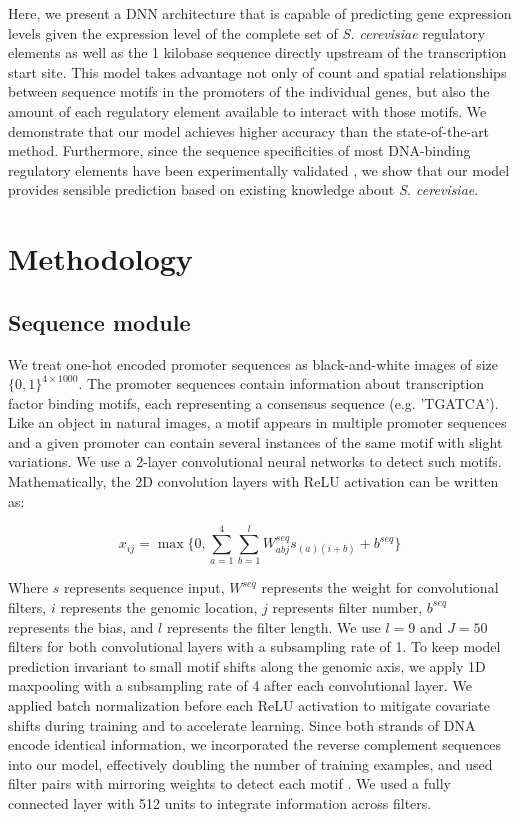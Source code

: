 \documentclass{article}
\begin{document}
Here, we present a DNN architecture that is capable of predicting gene expression levels given the expression level of the complete set of \textit{S. cerevisiae} regulatory elements as well as the 1 kilobase sequence directly upstream of the transcription start site. This model takes advantage not only of count and spatial relationships between sequence motifs in the promoters of the individual genes, but also the amount of each regulatory element available to interact with those motifs. We demonstrate that our model achieves higher accuracy than the state-of-the-art method. Furthermore, since the sequence specificities of most DNA-binding regulatory elements have been experimentally validated \cite{deBoer:2011ic}, we show that our model provides sensible prediction based on existing knowledge about \textit{S. cerevisiae}.


\section{Methodology}

\subsection{Sequence module}
We treat one-hot encoded promoter sequences as black-and-white images of size $\{0,1\}^{4 \times 1000}$. The promoter sequences contain information about transcription factor binding motifs, each representing a consensus sequence (e.g. 'TGATCA'). Like an object in natural images, a motif appears in multiple promoter sequences and a given promoter can contain several instances of the same motif with slight variations. We use a 2-layer convolutional neural networks to detect such motifs. Mathematically, the 2D convolution layers with ReLU activation can be written as: 

\begin{equation} \label{eq1}
x_{ij}=\max \{ 0, \sum_{a=1}^{4} \sum_{b=1}^{l} W_{abj}^{seq} s_{(a)(i+b)} + b^{seq}\}
\end{equation} 

Where $s$ represents sequence input, $W^{seq}$ represents the weight for convolutional filters, $i$ represents the genomic location, $j$ represents filter number, $b^{seq}$ represents the bias, and $l$ represents the filter length. We use $l=9$ and $J=50$ filters for both convolutional layers with a subsampling rate of 1. To keep model prediction invariant to small motif shifts along the genomic axis, we apply 1D maxpooling with a subsampling rate of 4 after each convolutional layer. We applied batch normalization before each ReLU activation to mitigate covariate shifts during training and to accelerate learning. Since both strands of DNA encode identical information, we incorporated the reverse complement sequences into our model, effectively doubling the number of training examples, and used filter pairs with mirroring weights to detect each motif \cite{Anonymous:_KTX_iBy}. We used a fully connected layer with 512 units to integrate information across filters. 
\end{document}
